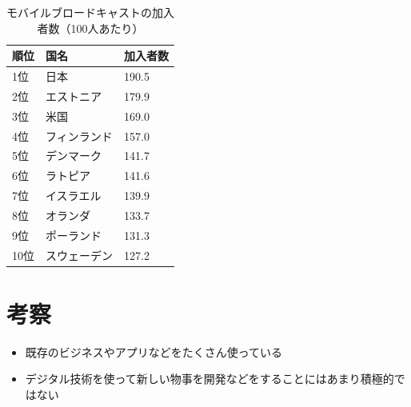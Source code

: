 \documentclass[a4paper,11pt,dvipdfmx]{ujarticle}
\begin{document}
\begin{table}[htbp]
    \centering
    \caption{モバイルブロードキャストの加入者数（100人あたり）}
    \label{tbl:モバキャス}

    \begin{tabular}{|l|l|l|}\hline
        順位 & 国名 & 加入者数 \\
        \hline
        1位 & 日本 & 190.5 \\
        \hline
        2位 & エストニア & 179.9 \\
        \hline
        3位 & 米国 & 169.0 \\
        \hline
        4位 & フィンランド & 157.0 \\
        \hline
        5位 & デンマーク & 141.7 \\
        \hline
        6位 & ラトピア & 141.6 \\
        \hline
        7位 & イスラエル & 139.9 \\
        \hline
        8位 & オランダ & 133.7 \\
        \hline
        9位 & ポーランド & 131.3 \\
        \hline
        10位 & スウェーデン & 127.2 \\
        \hline
    \end{tabular}
\end{table}

\section{考察}

\begin{itemize}
    \item 既存のビジネスやアプリなどをたくさん使っている
    \item デジタル技術を使って新しい物事を開発などをすることにはあまり積極的ではない 
\end{itemize}









\end{document}
